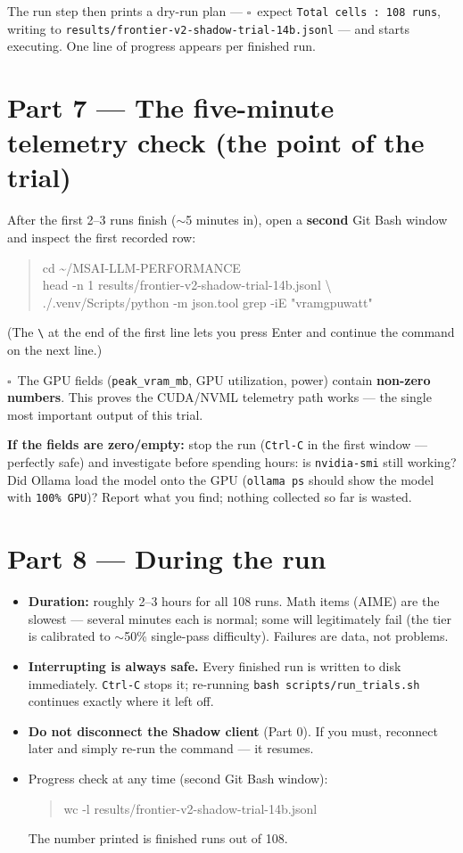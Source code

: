\documentclass[11pt]{article}
\newcommand{\cmd}[1]{\colorbox{cmdbg}{\texttt{#1}}}
\newenvironment{cmdblock}{\begin{quote}\small\begin{ttfamily}}{\end{ttfamily}\end{quote}}
\newcommand{\checkbox}{$\square$~}
\begin{document}
The run step then prints a dry-run plan --- \checkbox expect
\texttt{Total cells : 108 runs}, writing to
\texttt{results/frontier-v2-shadow-trial-14b.jsonl} --- and starts executing.
One line of progress appears per finished run.

\section*{Part 7 --- The five-minute telemetry check (the point of the trial)}

After the first 2--3 runs finish ($\sim$5 minutes in), open a \textbf{second} Git Bash
window and inspect the first recorded row:

\begin{cmdblock}
cd \textasciitilde/MSAI-LLM-PERFORMANCE \\
head -n 1 results/frontier-v2-shadow-trial-14b.jsonl \textbackslash \\
\mbox{\quad}\textbar{} ./.venv/Scripts/python -m json.tool \textbar{} grep -iE "vram\textbar gpu\textbar watt"
\end{cmdblock}
(The \texttt{\textbackslash} at the end of the first line lets you press Enter and
continue the command on the next line.)

\checkbox The GPU fields (\texttt{peak\_vram\_mb}, GPU utilization, power) contain
\textbf{non-zero numbers}. This proves the CUDA/NVML telemetry path works --- the
single most important output of this trial.

\textbf{If the fields are zero/empty:} stop the run (\texttt{Ctrl-C} in the first
window --- perfectly safe) and investigate before spending hours: is
\texttt{nvidia-smi} still working? Did Ollama load the model onto the GPU
(\cmd{ollama ps} should show the model with \texttt{100\% GPU})? Report what you find;
nothing collected so far is wasted.

\section*{Part 8 --- During the run}

\begin{itemize}
  \item \textbf{Duration:} roughly 2--3 hours for all 108 runs. Math items (AIME) are the
    slowest --- several minutes each is normal; some will legitimately fail (the tier is
    calibrated to $\sim$50\% single-pass difficulty). Failures are data, not problems.
  \item \textbf{Interrupting is always safe.} Every finished run is written to disk
    immediately. \texttt{Ctrl-C} stops it; re-running
    \cmd{bash scripts/run\_trials.sh} continues exactly where it left off.
  \item \textbf{Do not disconnect the Shadow client} (Part 0). If you must, reconnect
    later and simply re-run the command --- it resumes.
  \item Progress check at any time (second Git Bash window):
\begin{cmdblock}
wc -l results/frontier-v2-shadow-trial-14b.jsonl
\end{cmdblock}
    The number printed is finished runs out of 108.
\end{itemize}
\end{document}
